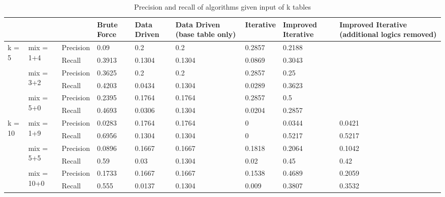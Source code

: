 \begin{table}[h!]
    \centering
    \scriptsize
    \begin{center}
      \caption{Precision and recall of algorithms given input of k tables}
      \label{tab:table3}
      \begin{tabular}{|p{}|p{}|p{}|p{}|p{}|p{}|p{}|p{}|p{}|}  
        \hline
        & & & \textbf{Brute Force} & \textbf{Data Driven} & \textbf{Data Driven (base table only)} & \textbf{Iterative} & \textbf{Improved Iterative} & \textbf{Improved Iterative (additional logics removed)}\\
        \hline
        \multirow{6}{*}{k = 5} & \multirow{2}{*}{mix = 1+4} & Precision & 0.09 & 0.2 & 0.2 & 0.2857 & 0.2188 & \\
        \cline{3-9}
        & & Recall & 0.3913 & 0.1304 & 0.1304 & 0.0869 & 0.3043 & \\
        \cline{2-9}
        & \multirow{2}{*}{mix = 3+2} & Precision & 0.3625 & 0.2 &  0.2 & 0.2857 & 0.25 & \\
        \cline{3-9}
        & & Recall & 0.4203 & 0.0434 & 0.1304 & 0.0289 & 0.3623 & \\
        \cline{2-9}
        & \multirow{2}{*}{mix = 5+0} & Precision & 0.2395 & 0.1764 & 0.1764 & 0.2857 & 0.5 & \\
        \cline{3-9}
        & & Recall & 0.4693 & 0.0306 & 0.1304 & 0.0204 & 0.2857 & \\
        \hline        
        \multirow{6}{*}{k = 10} & \multirow{2}{*}{mix = 1+9} & Precision & 0.0283 & 0.1764 & 0.1764 & 0 & 0.0344 & 0.0421 \\
        \cline{3-9}
        & & Recall & 0.6956 & 0.1304 & 0.1304 & 0 & 0.5217 & 0.5217 \\
        \cline{2-9}
        & \multirow{2}{*}{mix = 5+5} & Precision & 0.0896 & 0.1667 & 0.1667 & 0.1818 & 0.2064 & 0.1042 \\
        \cline{3-9}
        & & Recall & 0.59 & 0.03 & 0.1304 & 0.02 & 0.45 & 0.42 \\
        \cline{2-9}
        & \multirow{2}{*}{mix = 10+0} & Precision & 0.1733 & 0.1667 & 0.1667 & 0.1538 & 0.4689 & 0.2059 \\
        \cline{3-9}
        & & Recall & 0.555 & 0.0137 & 0.1304 & 0.009 & 0.3807 & 0.3532 \\
        \hline
      \end{tabular}
    \end{center}
\end{table}

